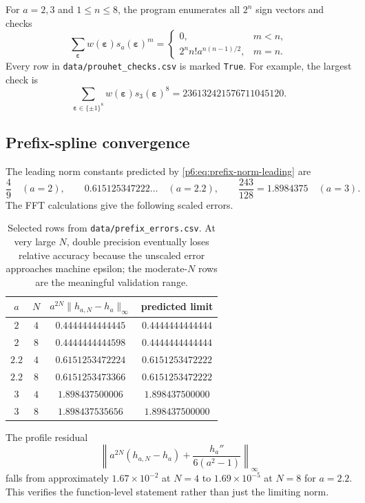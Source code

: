 \documentclass[11pt,oneside]{article}
\numberwithin{equation}{section}
\theoremstyle{definition}
\theoremstyle{remark}
\begin{document}
For $a=2,3$ and $1\le n\le8$, the program enumerates all $2^n$ sign vectors and
checks
\[
 \sum_{\boldsymbol\varepsilon}w(\boldsymbol\varepsilon)
 s_a(\boldsymbol\varepsilon)^m
 =\begin{cases}
 0,&m<n,\\
 2^nn!a^{n(n-1)/2},&m=n.
 \end{cases}
\]
Every row in \texttt{data/prouhet\_checks.csv} is marked
\texttt{True}.  For example, the largest check is
\[
 \sum_{\boldsymbol\varepsilon\in\{\pm1\}^8}
 w(\boldsymbol\varepsilon)s_3(\boldsymbol\varepsilon)^8
 =236132421576711045120.
\]

\subsection{Prefix-spline convergence}

The leading norm constants predicted by \eqref{p6:eq:prefix-norm-leading} are
\begin{equation}\label{p6:eq:numeric-limit-constants}
 \frac49\quad(a=2),
 \qquad
 0.615125347222\ldots\quad(a=2.2),
 \qquad
 \frac{243}{128}=1.8984375\quad(a=3).
\end{equation}
The FFT calculations give the following scaled errors.
\begin{table}[H]
\centering
\small
\begin{tabular}{@{}cccc@{}}
\toprule
$a$ & $N$ & $a^{2N}\|h_{a,N}-h_a\|_\infty$ & predicted limit \\
\midrule
$2$ & $4$ & $0.4444444444445$ & $0.4444444444444$ \\
$2$ & $8$ & $0.4444444444598$ & $0.4444444444444$ \\
$2.2$ & $4$ & $0.6151253472224$ & $0.6151253472222$ \\
$2.2$ & $8$ & $0.6151253473366$ & $0.6151253472222$ \\
$3$ & $4$ & $1.898437500006$ & $1.898437500000$ \\
$3$ & $8$ & $1.898437535656$ & $1.898437500000$ \\
\bottomrule
\end{tabular}
\caption{Selected rows from \texttt{data/prefix\_errors.csv}.  At very large
$N$, double precision eventually loses relative accuracy because the unscaled
error approaches machine epsilon; the moderate-$N$ rows are the meaningful
validation range.}
\label{p6:tab:prefix-errors}
\end{table}

The profile residual
\[
 \left\|a^{2N}(h_{a,N}-h_a)
 +\frac{h_a''}{6(a^2-1)}\right\|_\infty
\]
falls from approximately $1.67\times10^{-2}$ at $N=4$ to
$1.69\times10^{-5}$ at $N=8$ for $a=2.2$.  This verifies the function-level
statement rather than just the limiting norm.
\end{document}
